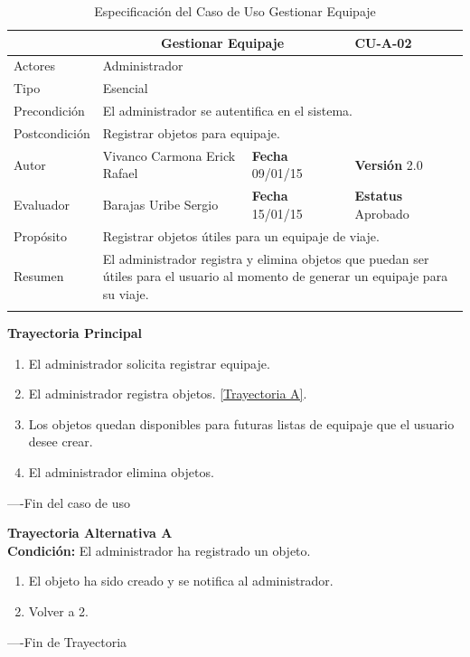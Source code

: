 \begin{longtable}{|p{2.5cm}|p{6.4cm}|p{2cm}|p{2cm}|}
	\hline
		\rowcolor[RGB]{51,153,255}{Caso de Uso}&\multicolumn{2}{c}{Gestionar Equipaje}&{\textbf{CU-A-02}}\\
	\hline
		{Actores}&\multicolumn{3}{p{11.2cm}|}{Administrador}\\
	\hline
		{Tipo}&\multicolumn{3}{p{11.2cm}|}{Esencial}\\
	\hline
		{Precondición}&\multicolumn{3}{p{11.2cm}|}{El administrador se autentifica en el sistema.}\\
	\hline
		{Postcondición}&\multicolumn{3}{p{11.2cm}|}{Registrar objetos para equipaje.}\\
	\hline
		{Autor}&{Vivanco Carmona Erick Rafael}&{\textbf{Fecha} 09/01/15}&{\textbf{Versión} 2.0}\\
			\hline
		{Evaluador}&{Barajas Uribe Sergio}&{\textbf{Fecha} 15/01/15}&{\textbf{Estatus} Aprobado}\\
	\hline
		{Propósito}&\multicolumn{3}{p{11.2cm}|}{Registrar objetos útiles para un equipaje de viaje.}\\
	\hline
		{Resumen}&\multicolumn{3}{p{11.2cm}|}{El administrador registra y elimina objetos que puedan ser útiles para el usuario al momento de generar un equipaje para su viaje.}\\	
	\hline
	\caption[Especificación del Caso de Uso Gestionar Equipaje]{Especificación del Caso de Uso Gestionar Equipaje}
    	\label{tab:cuGestionarEquipaje}
\end{longtable}

\begin{flushleft}
	\textbf{Trayectoria Principal}\\
	\begin{enumerate}
		\item El administrador solicita registrar equipaje.
		\item El administrador registra objetos. \hyperlink{TrayectoriaA_CU-A-02}{[Trayectoria A]}.
		\item Los objetos quedan disponibles para futuras listas de equipaje que el usuario desee crear.
		\item El administrador elimina objetos.
	\end{enumerate}
\end{flushleft}
----Fin del caso de uso

\begin{flushleft}
	\hypertarget{TrayectoriaA_CU-A-02}{}
	\textbf{Trayectoria Alternativa A}\\
	\textbf{Condición:} El administrador ha registrado un objeto. \\
	\begin{enumerate}
		\item El objeto ha sido creado y se notifica al administrador. 
		\item Volver a 2.
	\end{enumerate}
\end{flushleft}
----Fin de Trayectoria
\clearpage

